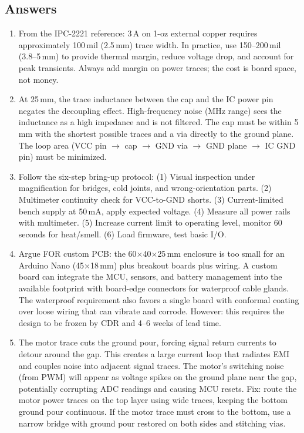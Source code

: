 \subsection{Answers}
\begin{enumerate}[leftmargin=1.5em]
\item From the IPC-2221 reference: 3\,A on 1-oz external copper requires approximately 100\,mil (2.5\,mm) trace width. In practice, use 150--200\,mil (3.8--5\,mm) to provide thermal margin, reduce voltage drop, and account for peak transients. Always add margin on power traces; the cost is board space, not money.
\item At 25\,mm, the trace inductance between the cap and the IC power pin negates the decoupling effect. High-frequency noise (MHz range) sees the inductance as a high impedance and is not filtered. The cap must be within 5\,mm with the shortest possible traces and a via directly to the ground plane. The loop area (VCC pin $\to$ cap $\to$ GND via $\to$ GND plane $\to$ IC GND pin) must be minimized.
\item Follow the six-step bring-up protocol: (1) Visual inspection under magnification for bridges, cold joints, and wrong-orientation parts. (2) Multimeter continuity check for VCC-to-GND shorts. (3) Current-limited bench supply at 50\,mA, apply expected voltage. (4) Measure all power rails with multimeter. (5) Increase current limit to operating level, monitor 60 seconds for heat/smell. (6) Load firmware, test basic I/O.
\item Argue FOR custom PCB: the 60$\times$40$\times$25\,mm enclosure is too small for an Arduino Nano (45$\times$18\,mm) plus breakout boards plus wiring. A custom board can integrate the MCU, sensors, and battery management into the available footprint with board-edge connectors for waterproof cable glands. The waterproof requirement also favors a single board with conformal coating over loose wiring that can vibrate and corrode. However: this requires the design to be frozen by CDR and 4--6 weeks of lead time.
\item The motor trace cuts the ground pour, forcing signal return currents to detour around the gap. This creates a large current loop that radiates EMI and couples noise into adjacent signal traces. The motor's switching noise (from PWM) will appear as voltage spikes on the ground plane near the gap, potentially corrupting ADC readings and causing MCU resets. Fix: route the motor power traces on the top layer using wide traces, keeping the bottom ground pour continuous. If the motor trace must cross to the bottom, use a narrow bridge with ground pour restored on both sides and stitching vias.

\end{enumerate}
